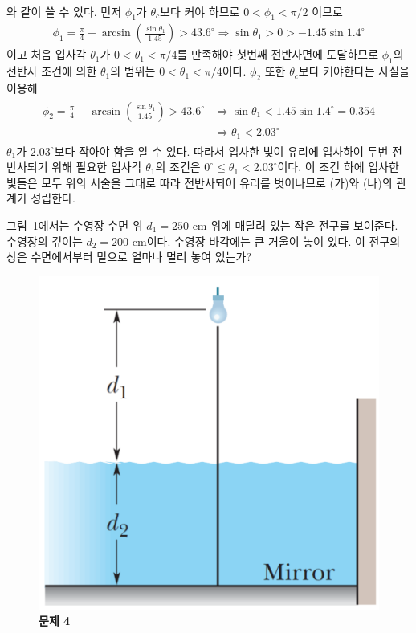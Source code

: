 \documentclass[tightenlines,floatfix,nofootinbib,superscriptaddress,fleqn]{revtex4-2}
\begin{document}
\begin{itemize}
\begin{align}
  \end{align}
  와 같이 쓸 수 있다. 먼저 $\phi_1$가 $\theta_c$보다 커야 하므로
  $0<\phi_1<\pi/2$ 이므로 
  \begin{align}
    \phi_1 = \frac{\pi}{4}
    +\arcsin\left(\frac{\sin\theta_1}{1.45}\right)
    >43.6^\circ \Longrightarrow
    \sin\theta_1>0>-1.45\sin1.4^\circ
  \end{align}
  이고 처음 입사각 $\theta_1$가 $0<\theta_1<\pi/4$를 만족해야 첫번째 전반사면에
  도달하므로 $\phi_1$의 전반사 조건에 의한 $\theta_1$의 범위는
  $0<\theta_1<\pi/4$이다. $\phi_2$ 또한 $\theta_c$보다 커야한다는 사실을 이용해
  \begin{align}
    \begin{split}
      \phi_2 =  \frac{\pi}{4}
      -\arcsin\left(\frac{\sin\theta_1}{1.45}\right)
      >43.6^\circ &\Longrightarrow
      \sin\theta_1<1.45\sin1.4^\circ = 0.354 \\
      &\Longrightarrow\theta_1 < 2.03^\circ
    \end{split}
  \end{align}
  $\theta_1$가 $2.03^\circ$보다 작아야 함을 알 수 있다. 따라서 입사한 빛이 유리에 입사하여
  두번 전반사되기 위해 필요한 입사각 $\theta_1$의 조건은 $0^\circ\leq \theta_1
  <2.03^\circ$이다. 이 조건 하에 입사한 빛들은 모두 위의 서술을 그대로 따라 전반사되어
  유리를 벗어나므로 (가)와 (나)의 관계가 성립한다.
\end{itemize}
 

\vspace{1cm}


그림~\ref{fig:2}에서는 수영장 수면 위 $d_1=250$ cm 위에 매달려 있는
작은 전구를 보여준다. 수영장의 깊이는 $d_2=200$ cm이다. 수영장
바각에는 큰 거울이 놓여 있다. 이 전구의 상은 수면에서부터 밑으로 얼마나 멀리
놓여 있는가? 
\begin{figure}[htp]
  \centering
  \includegraphics[scale=0.35]{qfig13-4-20221031.pdf} 
  \caption{\textbf{문제 4}}
  \label{fig:2}
\end{figure}
\end{document}
